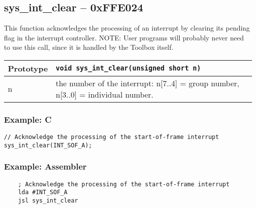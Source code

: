 \subsection*{sys\_int\_clear -- 0xFFE024}
This function acknowledges the processing of an interrupt by clearing its pending flag in the interrupt controller.
NOTE: User programs will probably never need to use this call, since it is handled by the Toolbox itself.

\bigskip

\begin{tabular}{|l||l|} \hline
Prototype & \lstinline!void sys_int_clear(unsigned short n)! \\ \hline
n & the number of the interrupt: n[7..4] = group number, n[3..0] = individual number. \\ \hline
\end{tabular}

\subsubsection*{Example: C}
\begin{lstlisting}
// Acknowledge the processing of the start-of-frame interrupt
sys_int_clear(INT_SOF_A);
\end{lstlisting}

\subsubsection*{Example: Assembler}
\begin{verbatim}
    ; Acknowledge the processing of the start-of-frame interrupt
    lda #INT_SOF_A
    jsl sys_int_clear
\end{verbatim}